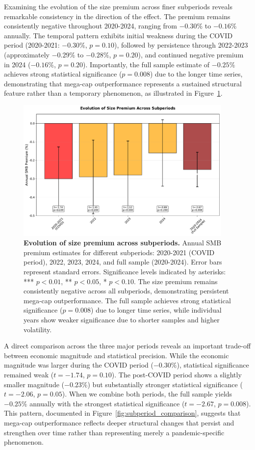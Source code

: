 \documentclass[10pt,letterpaper]{article}
\begin{document}
Examining the evolution of the size premium across finer subperiods reveals remarkable consistency in the direction of the effect. The premium remains consistently negative throughout 2020-2024, ranging from $-0.30\%$ to $-0.16\%$ annually. The temporal pattern exhibits initial weakness during the COVID period (2020-2021: $-0.30\%$, $p=0.10$), followed by persistence through 2022-2023 (approximately $-0.29\%$ to $-0.28\%$, $p=0.20$), and continued negative premium in 2024 ($-0.16\%$, $p=0.20$). Importantly, the full sample estimate of $-0.25\%$ achieves strong statistical significance ($p=0.008$) due to the longer time series, demonstrating that mega-cap outperformance represents a sustained structural feature rather than a temporary phenomenon, as illustrated in Figure~\ref{fig:annual_evolution}.

\begin{figure}[!h]
\centering
\includegraphics[width=0.95\textwidth]{figures/fig7_annual_smb_evolution.pdf}
\caption{\textbf{Evolution of size premium across subperiods.}
Annual SMB premium estimates for different subperiods: 2020-2021 (COVID period), 2022, 2023, 2024, and full sample (2020-2024). Error bars represent standard errors. Significance levels indicated by asterisks: *** $p<0.01$, ** $p<0.05$, * $p<0.10$. The size premium remains consistently negative across all subperiods, demonstrating persistent mega-cap outperformance. The full sample achieves strong statistical significance ($p=0.008$) due to longer time series, while individual years show weaker significance due to shorter samples and higher volatility.}
\label{fig:annual_evolution}
\end{figure}

A direct comparison across the three major periods reveals an important trade-off between economic magnitude and statistical precision. While the economic magnitude was larger during the COVID period ($-0.30\%$), statistical significance remained weak ($t=-1.74$, $p=0.10$). The post-COVID period shows a slightly smaller magnitude ($-0.23\%$) but substantially stronger statistical significance ($t=-2.06$, $p=0.05$). When we combine both periods, the full sample yields $-0.25\%$ annually with the strongest statistical significance ($t=-2.67$, $p=0.008$). This pattern, documented in Figure~\ref{fig:subperiod_comparison}, suggests that mega-cap outperformance reflects deeper structural changes that persist and strengthen over time rather than representing merely a pandemic-specific phenomenon.
\end{document}
